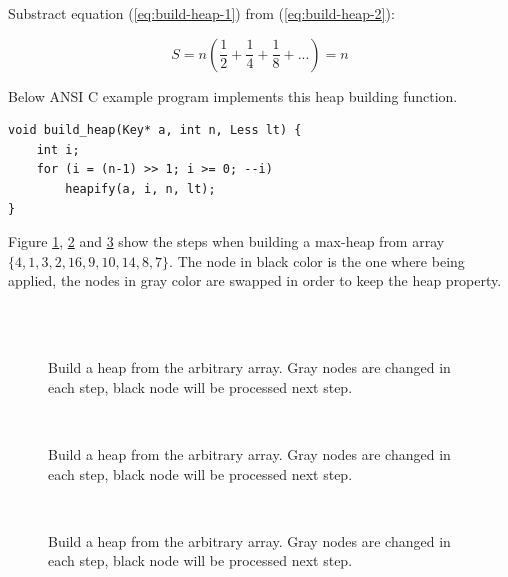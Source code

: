 \documentclass[b5paper]{article}
\begin{document}
Substract equation (\ref{eq:build-heap-1}) from (\ref{eq:build-heap-2}):

\[
S = n (\frac{1}{2} + \frac{1}{4} + \frac{1}{8} + ...) = n
\]

Below ANSI C example program implements this heap building function.

\lstset{language=C}
\begin{lstlisting}
void build_heap(Key* a, int n, Less lt) {
    int i;
    for (i = (n-1) >> 1; i >= 0; --i)
        heapify(a, i, n, lt);
}
\end{lstlisting}

Figure \ref{fig:build-heap-1}, \ref{fig:build-heap-2} and \ref{fig:build-heap-3}
show the steps when building a max-heap from
array $\{4, 1, 3, 2, 16, 9, 10, 14, 8, 7\}$.
The node in black color is the one where  being
applied, the nodes in gray color are swapped in order to keep the heap property.

\begin{figure}[htbp]
    \centering
     \\
     \\
    \caption{Build a heap from the arbitrary array. Gray nodes are changed in each step,
black node will be processed next step.} \label{fig:build-heap-1}
\end{figure}

\begin{figure}[htbp]
    \centering
     \\
    \caption{Build a heap from the arbitrary array. Gray nodes are changed in each step,
black node will be processed next step.} \label{fig:build-heap-2}
\end{figure}

\begin{figure}[htbp]
    \centering
     \\
    \caption{Build a heap from the arbitrary array. Gray nodes are changed in each step,
black node will be processed next step.} \label{fig:build-heap-3}
\end{figure}
\end{document}

